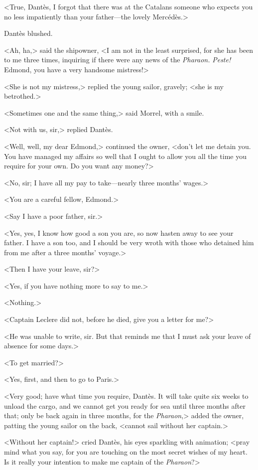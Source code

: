  <True, Dantès, I forgot that there was at the Catalans someone who expects you no less impatiently than your father—the lovely Mercédès.> 

 Dantès blushed. 

 <Ah, ha,> said the shipowner, <I am not in the least surprised, for she has been to me three times, inquiring if there were any news of the \textit{Pharaon.} \textit{Peste!} Edmond, you have a very handsome mistress!> 

 <She is not my mistress,> replied the young sailor, gravely; <she is my betrothed.> 

 <Sometimes one and the same thing,> said Morrel, with a smile. 

 <Not with us, sir,> replied Dantès. 

 <Well, well, my dear Edmond,> continued the owner, <don't let me detain you. You have managed my affairs so well that I ought to allow you all the time you require for your own. Do you want any money?> 

 <No, sir; I have all my pay to take—nearly three months' wages.> 

 <You are a careful fellow, Edmond.> 

 <Say I have a poor father, sir.> 

 <Yes, yes, I know how good a son you are, so now hasten away to see your father. I have a son too, and I should be very wroth with those who detained him from me after a three months' voyage.> 

 <Then I have your leave, sir?> 

 <Yes, if you have nothing more to say to me.> 

 <Nothing.> 

 <Captain Leclere did not, before he died, give you a letter for me?> 

 <He was unable to write, sir. But that reminds me that I must ask your leave of absence for some days.> 

 <To get married?> 

 <Yes, first, and then to go to Paris.> 

 <Very good; have what time you require, Dantès. It will take quite six weeks to unload the cargo, and we cannot get you ready for sea until three months after that; only be back again in three months, for the \textit{Pharaon},> added the owner, patting the young sailor on the back, <cannot sail without her captain.> 

 <Without her captain!> cried Dantès, his eyes sparkling with animation; <pray mind what you say, for you are touching on the most secret wishes of my heart. Is it really your intention to make me captain of the \textit{Pharaon}?> 

